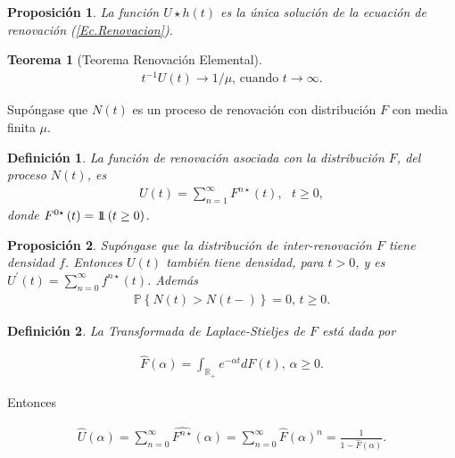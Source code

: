 \documentclass{article}
\newtheorem{Def}{Definición}[section]
\newtheorem{Teo}{Teorema}[section]
\newtheorem{Prop}{Proposición}[section]
\newcommand{\rea}{\mathbb{R}}
\newcommand{\prob}{\mathbb{P}}
\newcommand{\indora}{\mbox{$1$\hspace{-0.8ex}$1$}}
\numberwithin{equation}{section}
\begin{document}
\begin{Prop}
La funci\'on $U\star h\left(t\right)$ es la \'unica soluci\'on de la ecuaci\'on de renovaci\'on (\ref{Ec.Renovacion}).
\end{Prop}

\begin{Teo}[Teorema Renovaci\'on Elemental]
\begin{eqnarray*}
t^{-1}U\left(t\right)\rightarrow 1/\mu\textrm{,    cuando }t\rightarrow\infty.
\end{eqnarray*}
\end{Teo}



Sup\'ongase que $N\left(t\right)$ es un proceso de renovaci\'on con distribuci\'on $F$ con media finita $\mu$.

\begin{Def}
La funci\'on de renovaci\'on asociada con la distribuci\'on $F$, del proceso $N\left(t\right)$, es
\begin{eqnarray*}
U\left(t\right)=\sum_{n=1}^{\infty}F^{n\star}\left(t\right),\textrm{   }t\geq0,
\end{eqnarray*}
donde $F^{0\star}\left(t\right)=\indora\left(t\geq0\right)$.
\end{Def}


\begin{Prop}
Sup\'ongase que la distribuci\'on de inter-renovaci\'on $F$ tiene densidad $f$. Entonces $U\left(t\right)$ tambi\'en tiene densidad, para $t>0$, y es $U^{'}\left(t\right)=\sum_{n=0}^{\infty}f^{n\star}\left(t\right)$. Adem\'as
\begin{eqnarray*}
\prob\left\{N\left(t\right)>N\left(t-\right)\right\}=0\textrm{,   }t\geq0.
\end{eqnarray*}
\end{Prop}

\begin{Def}
La Transformada de Laplace-Stieljes de $F$ est\'a dada por

\begin{eqnarray*}
\hat{F}\left(\alpha\right)=\int_{\rea_{+}}e^{-\alpha t}dF\left(t\right)\textrm{,  }\alpha\geq0.
\end{eqnarray*}
\end{Def}

Entonces

\begin{eqnarray*}
\hat{U}\left(\alpha\right)=\sum_{n=0}^{\infty}\hat{F^{n\star}}\left(\alpha\right)=\sum_{n=0}^{\infty}\hat{F}\left(\alpha\right)^{n}=\frac{1}{1-\hat{F}\left(\alpha\right)}.
\end{eqnarray*}
\end{document}
